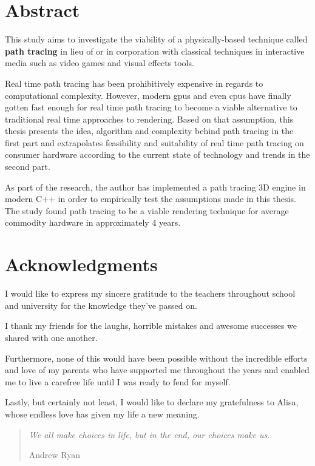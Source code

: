 \documentclass[
  twoside,
  11pt, a4paper,
  footinclude=true,
  headinclude=true,
  cleardoublepage=empty
]{scrreprt}
\begin{document}


\chapter*{Abstract}
\onehalfspace
This study aims to investigate the viability of a physically-based technique called
\textbf{path tracing} in lieu of or in corporation with classical techniques in interactive media
such as video games and visual effects tools.

Real time path tracing has been prohibitively expensive in regards to computational complexity.
However, modern \acs{gpu}s and even \acs{cpu}s have finally gotten fast enough for real time path
tracing to become a viable alternative to traditional real time approaches to rendering.  Based on
that assumption, this thesis presents the idea, algorithm and complexity behind path tracing in the
first part and extrapolates feasibility and suitability of real time path tracing on consumer
hardware according to the current state of technology and trends in the second part.

As part of the research, the author has implemented a path tracing 3D engine in modern C++ in order
to empirically test the assumptions made in this thesis. The study found path tracing to be a
viable rendering technique for average commodity hardware in approximately 4 years.
\singlespace

\chapter*{Acknowledgments}
\doublespacing
I would like to express my sincere gratitude to the teachers throughout school and university for
the knowledge they've passed on.

I thank my friends for the laughs, horrible mistakes and awesome successes we shared with
one another.

Furthermore, none of this would have been possible without the incredible efforts and love of my
parents who have supported me throughout the years and enabled me to live a carefree life until I
was ready to fend for myself.

Lastly, but certainly not least, I would like to declare my gratefulness to Alisa, whose endless love
has given my life a new meaning.

\singlespace

\clearpage
\vspace*{\fill}
\thispagestyle{empty} %
\begin{quotation}
    \em
    We all make choices in life, but in the end, our choices make us.

    \medskip
    \raggedleft
    Andrew Ryan
\end{quotation}
\vspace*{\fill}
\end{document}
